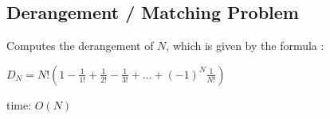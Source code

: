 \subsection{Derangement / Matching Problem}

Computes the derangement of $N$, which is given by the formula  :
  
$D_N = N! \left(1 - \frac{1}{1!} + \frac{1}{2!} - \frac{1}{3!} + \ldots + (-1)^N \frac{1}{N!}\right)$

time: $O(N)$
